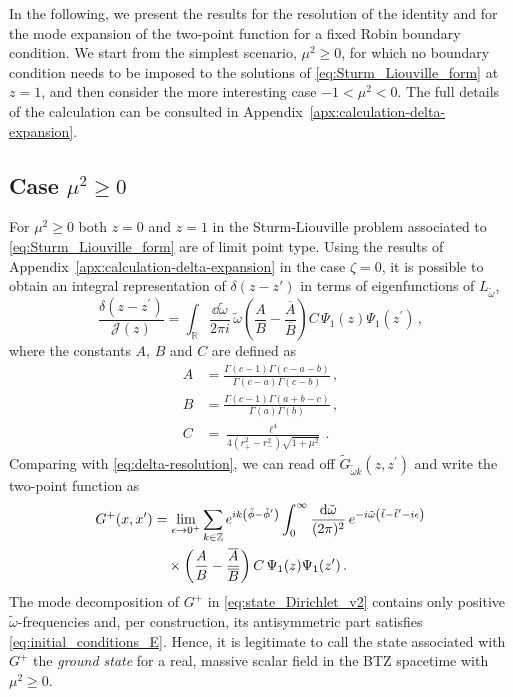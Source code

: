 \documentclass[aps, prd, amsmath, floats, floatfix, twocolumn, nofootinbib, superscriptaddress, showpacs]{revtex4-1}
\def\bR{{\mathbb R}}
\def\tomega{{\tilde{\omega}}}
\begin{document}
In the following, we present the results for the resolution of the identity and for the mode expansion of the two-point function for a fixed Robin boundary condition.
We start from the simplest scenario, $\mu^2\geqslant 0$, for which no boundary condition needs to be imposed to the solutions of \eqref{eq:Sturm_Liouville_form} at $z=1$, and then consider the more interesting case $-1 < \mu^2 < 0$. The full details of the calculation can be consulted in Appendix~\ref{apx:calculation-delta-expansion}.
	
	
\subsection{Case $\mu^2\geqslant 0$}

For $\mu^2 \geqslant 0$ both $z=0$ and $z=1$ in the Sturm-Liouville problem associated to \eqref{eq:Sturm_Liouville_form} are of limit point type. Using the results of Appendix~\ref{apx:calculation-delta-expansion} in the case $\zeta=0$, it is possible to obtain an integral representation of $\delta(z-z')$ in terms of eigenfunctions of $L_\tomega$,
%
$$\frac{\delta(z-z^\prime)}{\mathcal{J}(z)} = \int_{\bR} \frac{\dd\tilde{\omega}}{2\pi i} \, \tilde{\omega}  \left(\frac{A}{B}-\frac{\overline{A}}{\overline{B}}\right) C \, \Psi_1(z)\Psi_1(z^\prime) \, , $$
%
where the constants $A$, $B$ and $C$ are defined as
%
\begin{subequations} \label{eq:A_B_constants}
\begin{align}
A &= \frac{\Gamma(c-1)\Gamma(c-a-b)}{\Gamma(c-a)\Gamma(c-b)} \, , \\
B &=\frac{\Gamma(c-1)\Gamma(a+b-c)}{\Gamma(a)\Gamma(b)} \, , \\
C &= \frac{\ell^4}{4(r_+^2-r_-^2)\sqrt{1+\mu^2}} \, .
\end{align}
\end{subequations}
%
Comparing with \eqref{eq:delta-resolution}, we can read off $\widetilde{G}_{\tilde{\omega} k}(z,z^\prime)$ and write the two-point function as
%
\begin{align} 
G^+(x,x^\prime) &= \lim_{\epsilon \to 0^+} \sum\limits_{k\in\mathbb{Z}} e^{ik\left(\tilde{\phi}-\tilde{\phi}^\prime\right)}\int_0^\infty \frac{\dd\tilde{\omega}}{(2\pi)^2} \, e^{-i\tilde{\omega}\left(\tilde{t}-\tilde{t}^\prime-i\epsilon\right)} \notag
\\
&\quad \times \left(\frac{A}{B}-\frac{\overline{A}}{\overline{B}}\right) C \, \Psi_1(z)\Psi_1(z^\prime) \, . \label{eq:state_Dirichlet_v2}
\end{align}
%
The mode decomposition of $G^+$ in \eqref{eq:state_Dirichlet_v2} contains only positive $\tilde{\omega}$-frequencies and, per construction, its antisymmetric part satisfies \eqref{eq:initial_conditions_E}. Hence, it is legitimate to call the state associated with $G^+$ the {\em ground state} for a real, massive scalar field in the BTZ spacetime with $\mu^2 \geqslant 0$. 
\end{document}
